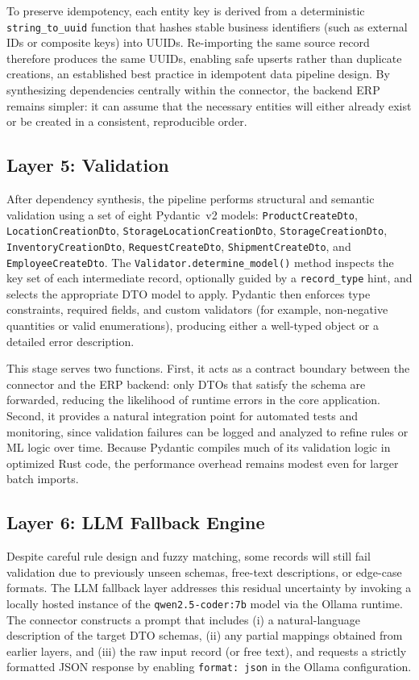 \documentclass{article}
\begin{document}
To preserve idempotency, each entity key is derived from a deterministic
\texttt{string\_to\_uuid} function that hashes stable business identifiers (such as external
IDs or composite keys) into UUIDs.
Re-importing the same source record therefore produces the same UUIDs, enabling safe upserts
rather than duplicate creations, an established best practice in idempotent data pipeline
design.\autocite{tacnode2026patterns}
By synthesizing dependencies centrally within the connector, the backend ERP remains simpler:
it can assume that the necessary entities will either already exist or be created in a
consistent, reproducible order.

\subsection{Layer 5: Validation}
After dependency synthesis, the pipeline performs structural and semantic validation using a
set of eight Pydantic~v2 models: \texttt{ProductCreateDto}, \texttt{LocationCreationDto},
\texttt{StorageLocationCreationDto}, \texttt{StorageCreationDto},
\texttt{InventoryCreationDto}, \texttt{RequestCreateDto}, \texttt{ShipmentCreateDto}, and
\texttt{EmployeeCreateDto}.
The \texttt{Validator.determine\_model()} method inspects the key set of each intermediate
record, optionally guided by a \texttt{record\_type} hint, and selects the appropriate DTO
model to apply.\autocite{pydantic2020docs}
Pydantic then enforces type constraints, required fields, and custom validators (for example,
non-negative quantities or valid enumerations), producing either a well-typed object or a
detailed error description.

This stage serves two functions.
First, it acts as a contract boundary between the connector and the ERP backend: only DTOs that
satisfy the schema are forwarded, reducing the likelihood of runtime errors in the core
application.\autocite{daily2024pydantic}
Second, it provides a natural integration point for automated tests and monitoring, since
validation failures can be logged and analyzed to refine rules or ML logic over time.
Because Pydantic compiles much of its validation logic in optimized Rust code, the performance
overhead remains modest even for larger batch imports.\autocite{pydantic2019why}

\subsection{Layer 6: LLM Fallback Engine}
Despite careful rule design and fuzzy matching, some records will still fail validation due to
previously unseen schemas, free-text descriptions, or edge-case formats.
The LLM fallback layer addresses this residual uncertainty by invoking a locally hosted
instance of the \texttt{qwen2.5-coder:7b} model via the Ollama
runtime.\autocite{daily2026ollama}
The connector constructs a prompt that includes (i) a natural-language description of the
target DTO schemas, (ii) any partial mappings obtained from earlier layers, and (iii) the raw
input record (or free text), and requests a strictly formatted JSON response by enabling
\texttt{format: json} in the Ollama configuration.
\end{document}
